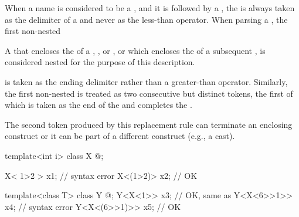 \pnum
{}%
When a name is considered to be a
,
and it is followed by a \tcode{<},
the \tcode{<}
is always taken as the delimiter of a
and never as the less-than operator.
When parsing a ,
the first non-nested
\tcode{>}
\begin{footnote}
A \tcode{>} that encloses the 
of a , , 
or , or which encloses the 
of a subsequent , is considered nested for the purpose
of this description.
\end{footnote}
is taken as the ending delimiter
rather than a greater-than operator.
Similarly, the first non-nested \tcode{>>} is treated as two
consecutive but distinct \tcode{>} tokens, the first of which is taken
as the end of the  and completes
the .
\begin{note}
The second \tcode{>}
token produced by this replacement rule can terminate an enclosing
 construct or it can be part of a different
construct (e.g., a cast).
\end{note}
\begin{example}
\begin{codeblock}
template<int i> class X { @\commentellip@ };

X< 1>2 > x1;                            // syntax error
X<(1>2)> x2;                            // OK

template<class T> class Y { @\commentellip@ };
Y<X<1>> x3;                             // OK, same as 
Y<X<6>>1>> x4;                          // syntax error
Y<X<(6>>1)>> x5;                        // OK
\end{codeblock}
\end{example}


